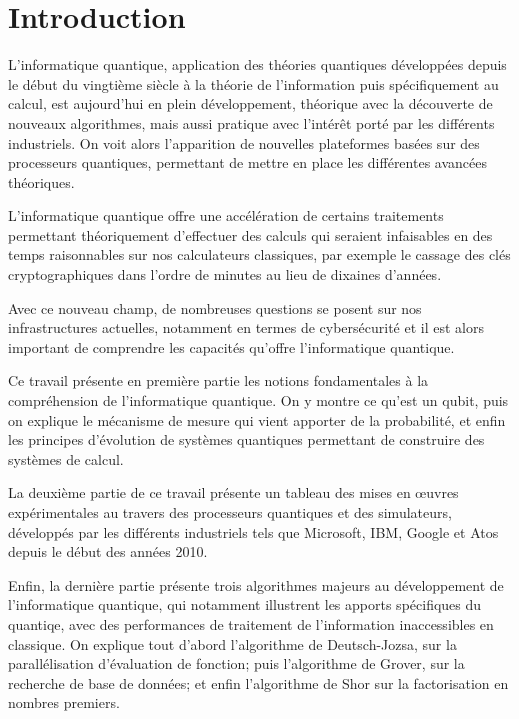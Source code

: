 \chapter{Introduction}

L'informatique quantique, application des théories quantiques développées depuis le début du vingtième siècle à la théorie de l'information puis spécifiquement au calcul, est aujourd'hui en plein développement, théorique avec la découverte de nouveaux algorithmes, mais aussi pratique avec l'intérêt porté par les différents industriels. On voit alors l'apparition de nouvelles plateformes basées sur des processeurs quantiques, permettant de mettre en place les différentes avancées théoriques.

L'informatique quantique offre une accélération de certains traitements permettant théoriquement d'effectuer des calculs qui seraient infaisables en des temps raisonnables sur nos calculateurs classiques, par exemple le cassage des clés cryptographiques dans l'ordre de minutes au lieu de dixaines d'années.

Avec ce nouveau champ, de nombreuses questions se posent sur nos infrastructures actuelles, notamment en termes de cybersécurité et il est alors important de comprendre les capacités qu'offre l'informatique quantique.

Ce travail présente en première partie les notions fondamentales à la compréhension de l'informatique quantique. On y montre ce qu'est un qubit, puis on explique le mécanisme de mesure qui vient apporter de la probabilité, et enfin les principes d'évolution de systèmes quantiques permettant de construire des systèmes de calcul.

La deuxième partie de ce travail présente un tableau des mises en \oe{}uvres expérimentales au travers des processeurs quantiques et des simulateurs, développés par les différents industriels tels que Microsoft, IBM, Google et Atos depuis le début des années 2010.

Enfin, la dernière partie présente trois algorithmes majeurs au développement de l'informatique quantique, qui notamment illustrent les apports spécifiques du quantiqe, avec des performances de traitement de l'information inaccessibles en classique. On explique tout d'abord l'algorithme de Deutsch-Jozsa, sur la parallélisation d'évaluation de fonction; puis l'algorithme de Grover, sur la recherche de base de données; et enfin l'algorithme de Shor sur la factorisation en nombres premiers.